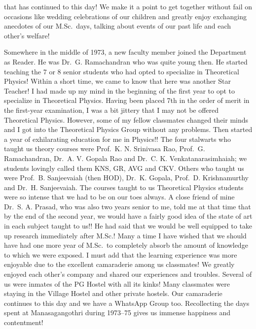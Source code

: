 that has continued to this day! We make it a point to get together without fail on occasions like wedding celebrations of our children and greatly enjoy exchanging anecdotes of our M.Sc.\ days, talking about events of our past life and each other's welfare!

Somewhere in the middle of 1973, a new faculty member joined the Department as Reader. He was Dr.\ G. Ramachandran who was quite young then. He started teaching the 7 or 8 senior students who had opted to specialize in Theoretical Physics! Within a short time, we came to know that here was another Star Teacher! I had made up my mind in the beginning of the first year to opt to specialize in Theoretical Physics. Having been placed 7th in the order of merit in the first-year examination, I was a bit jittery that I may not be offered Theoretical Physics. However, some of my fellow classmates changed their minds and I got into the Theoretical Physics Group without any problems. Then started a year of exhilarating education for me in Physics!! The four stalwarts who taught us theory courses were Prof.\ K. N. Srinivasa Rao, Prof.\ G. Ramachandran, Dr.\ A. V. Gopala Rao and Dr.\ C. K. Venkatanarasimhaiah; we students lovingly called them KNS, GR, AVG and CKV. Others who taught us were Prof.\ B. Sanjeevaiah (then HOD), Dr.\ K. Gopala, Prof.\ D. Krishnamurthy and Dr.\ H. Sanjeevaiah. The courses taught to us Theoretical Physics students were so intense that we had to be on our toes always. A close friend of mine Dr.\ S. A. Prasad, who was also two years senior to me, told me at that time that by the end of the second year, we would have a fairly good idea of the state of art in each subject taught to us!! He had said that we would be well equipped to take up research immediately after M.Sc.! Many a time I have wished that we should have had one more year of M.Sc.\ to completely absorb the amount of knowledge to which we were exposed. I must add that the learning experience was more enjoyable due to the excellent camaraderie among us classmates! We greatly enjoyed each other's company and shared our experiences and troubles. Several of us were inmates of the PG Hostel with all its kinks! Many classmates were staying in the Village Hostel and other private hostels. Our camaraderie continues to this day and we have a WhatsApp Group too. Recollecting the days spent at Manasagangothri during 1973--75 gives us immense happiness and contentment!

